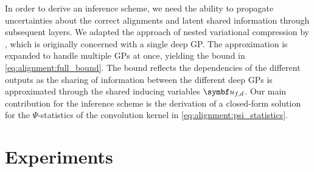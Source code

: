 In order to derive an inference scheme, we need the ability to propagate uncertainties about the correct alignments and latent shared information through subsequent layers.
We adapted the approach of nested variational compression by \textcite{hensman_nested_2014}, which is originally concerned with a single deep GP.
The approximation is expanded to handle multiple GPs at once, yielding the bound in \cref{eq:alignment:full_bound}.
The bound reflects the dependencies of the different outputs as the sharing of information between the different deep GPs is approximated through the shared inducing variables $\rv{u_{f,d}}$.
Our main contribution for the inference scheme is the derivation of a closed-form solution for the $\Psi$-statistics of the convolution kernel in \cref{eq:alignment:psi_statistics}.


\section{Experiments}
\label{toc:alignment:experiments}
